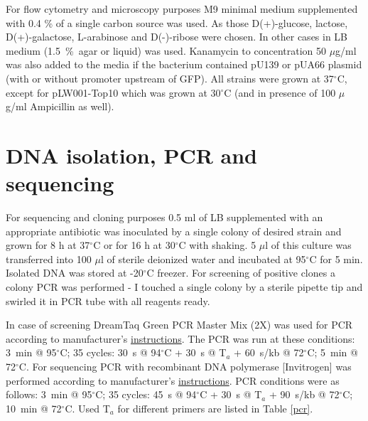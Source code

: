 For flow cytometry and microscopy purposes M9 minimal medium supplemented with 0.4 \% of a single carbon source was used.
As those D(+)-glucose, lactose, D(+)-galactose, L-arabinose and D(-)-ribose were chosen.
In other cases in LB medium (1.5~\%~agar or liquid) was used.
Kanamycin to concentration 50 $\mu$g/ml was also added to the media if the bacterium contained pU139 or pUA66 plasmid (with or without promoter upstream of GFP).
All strains were grown at 37$^{\circ}$C, except for pLW001-Top10 which was grown at 30$^{\circ}$C (and in presence of 100 $\mu$g/ml Ampicillin as well).


\section{DNA isolation, PCR and sequencing}
For sequencing and cloning purposes 0.5 ml of LB supplemented with an appropriate antibiotic was inoculated by a single colony of desired strain and grown for 8 h at 37$^{\circ}$C or for 16 h at 30$^{\circ}$C with shaking.
5 $\mu$l of this culture was transferred into 100 $\mu$l of sterile deionized water and incubated at 95$^{\circ}$C for 5 min.
Isolated DNA was stored at -20$^{\circ}$C freezer.
For screening of positive clones a colony PCR was performed - I touched a single colony by a sterile pipette tip and swirled it in PCR tube with all reagents ready.

In case of screening DreamTaq Green PCR Master Mix (2X) was used for PCR according to manufacturer's \href{https://assets.thermofisher.com/TFS-Assets/LSG/manuals/MAN0012704_DreamTaq_Green_PCR_MasterMix_K1081_UG.pdf}{instructions}.
The PCR was run at these conditions: 3~min @ 95$^{\circ}$C; 35 cycles: 30~s @ 94$^{\circ}$C + 30~s @ T$_{a}$ + 60~s/kb @ 72$^{\circ}$C; 5~min @ 72$^{\circ}$C.
For sequencing PCR with recombinant  DNA polymerase [Invitrogen] was performed according to manufacturer's \href{https://assets.thermofisher.com/TFS-Assets/LSG/manuals/0814_Taq_DNA_Polymerase_recombinant.pdf}{instructions}.
PCR conditions were as follows: 3~min @ 95$^{\circ}$C; 35 cycles: 45~s @ 94$^{\circ}$C + 30~s @ T$_{a}$ + 90~s/kb @ 72$^{\circ}$C; 10~min @ 72$^{\circ}$C. Used T$_{a}$ for different primers are listed in Table \ref{pcr}.

